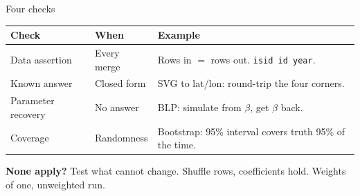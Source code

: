 \documentclass[aspectratio=1610, xcolor={dvipsnames}]{beamer}
\begin{document}
\begin{frame}{Four checks}

    \vspace{0.35cm}
    \renewcommand{\arraystretch}{1.7}
    \small
    \begin{tabular}{@{}p{} p{} p{}@{}}
        \toprule
        {\color{bhblue}\bfseries Check} & {\color{bhblue}\bfseries When} & {\color{bhblue}\bfseries Example}                       \\
        \midrule
        Data assertion                  & Every merge                    & Rows in $=$ rows out. \texttt{isid id year}.            \\
        Known answer                    & Closed form                    & SVG to lat/lon: round-trip the four corners.            \\
        Parameter recovery              & No answer                      & BLP: simulate from $\beta$, get $\beta$ back.           \\
        Coverage                        & Randomness                     & Bootstrap: 95\% interval covers truth 95\% of the time. \\
        \bottomrule
    \end{tabular}

    \vspace{0.6cm}
    {\color{bhblue}\bfseries None apply?} Test what cannot change. Shuffle rows, coefficients hold.
    Weights of one, unweighted run.

\end{frame}
\end{document}
